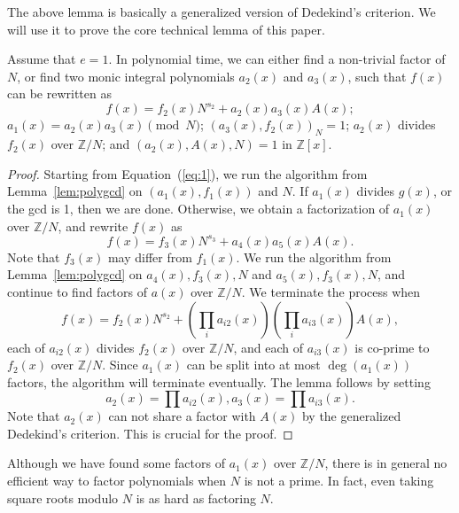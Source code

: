 \documentclass[runningheads, letter]{llncs}
\newcommand{\Z}{{\mathbb Z}}
\begin{document}
The above lemma is basically a generalized version of Dedekind's criterion.
We will use it to prove the core technical lemma of this paper.

\begin{lemma}
  Assume that \( e=1 \).
  In polynomial time, we can either find a non-trivial
  factor of \( N \),
  or find two monic integral polynomials \( a_2 (x) \)
  and \( a_3 (x) \),
  such that \( f(x) \) can be rewritten as  
  \begin{equation} \label{eq:2}
   f(x) =f_2(x) N^{s_2} + a_2 (x) a_3 (x) A(x); 
  \end{equation}
  \( a_1 (x)=a_2 (x) a_3 (x) \pmod{N} \);
  \( (a_3 (x), f_2(x))_N =1 \); \( a_2(x) \)
  divides \( f_2(x) \) over \( \Z/N \);
  and \( (a_2(x), A(x), N) = 1\) in \( \Z[x] \).
\end{lemma}

\begin{proof}
  Starting from Equation~(\ref{eq:1}),
  we run the algorithm from Lemma~\ref{lem:polygcd}
  on \linebreak \( (a_1(x), f_1 (x)) \) and \( N \). 
  If \( a_1(x) \) divides \( g(x) \),
  or the gcd is 1, then we are done. 
  Otherwise, we obtain a factorization of \( a_1(x) \) 
  over \( \Z/N \), and rewrite \( f(x) \) as
  \[ f(x) = f_3(x) N^{s_3} + a_4 (x) a_5 (x) A(x). \]
  Note that \( f_3(x) \) may differ from \( f_1(x) \).
  We run the
  algorithm from Lemma~\ref{lem:polygcd} on \( a_4(x), f_3(x), N \) and
  \( a_5(x), f_3(x), N \), and continue to find factors of \( a(x) \)
  over \( \Z/N \).
  We terminate the process when
  \[ f(x) = f_2 (x) N^{s_2} + ( \prod_i a_{i2}(x)) (\prod_i a_{i3} (x))
    A(x), \]
  each of \( a_{i2}(x) \)  divides \( f_2 (x) \) over \( \Z/N \),  
  and each of \( a_{i3}(x) \) is co-prime to
  \( f_2 (x) \) over \( \Z/N \).  Since \( a_1 (x) \) can be split
  into at most \( \deg(a_1(x)) \) factors, the
  algorithm will terminate eventually.
  The lemma follows by setting
  \[ a_2(x) = \prod a_{i2} (x), a_3(x) = \prod a_{i3}(x).  \]
  Note that \( a_2(x)   \) can not share a factor with \( A(x) \) 
  by the generalized
  Dedekind's criterion. This is crucial for the proof.
\end{proof}

%
%
Although we have found some factors of
\( a_1 (x) \) over \( \Z/N \),  
there is in general no efficient way to factor 
polynomials when \( N \) is not a prime.
In fact, even taking square roots modulo \( N \) is
as hard as factoring \( N \).
\end{document}
